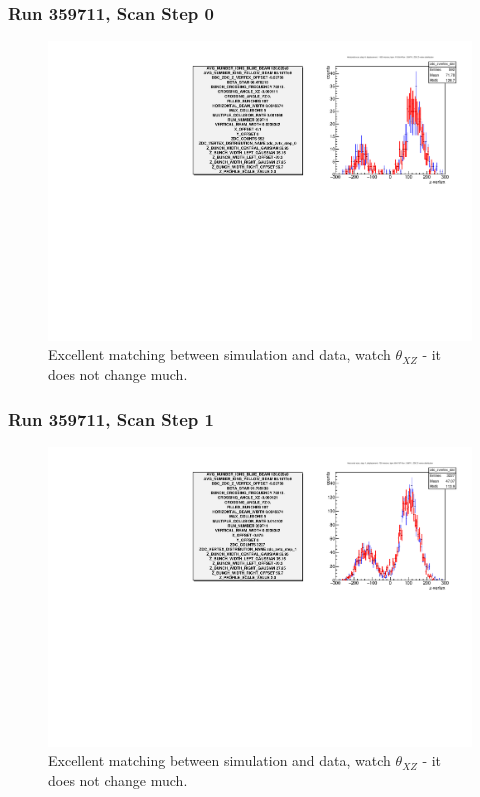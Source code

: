 \begin{frame}
\frametitle{Run 359711, Scan Step 0}
\begin{figure}
\begin{center}
\includegraphics[width=\linewidth]{"figs/359711_step_0_zdc_zvertex"}
\caption{Excellent matching between simulation and data, watch $\theta_{XZ}$ - it does not change much.}
\label{fig:359711_step_0_zdc_zvertex}
\end{center}
\end{figure}
\end{frame}

\begin{frame}
\frametitle{Run 359711, Scan Step 1}
\begin{figure}
\begin{center}
\includegraphics[width=\linewidth]{"figs/359711_step_1_zdc_zvertex"}
\caption{Excellent matching between simulation and data, watch $\theta_{XZ}$ - it does not change much.}
\label{fig:359711_step_1_zdc_zvertex}
\end{center}\end{figure}
\end{frame}


